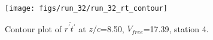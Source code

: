 \begin{figure}[H]
\centering
\texttt{[image: figs/run\_32/run\_32\_rt\_contour]}
\caption{Contour plot of $\overline{r^\prime t^\prime}$ at $z/c$=8.50, $V_{free}$=17.39, station 4.}
\label{fig:run_32_rt_contour}
\end{figure}


